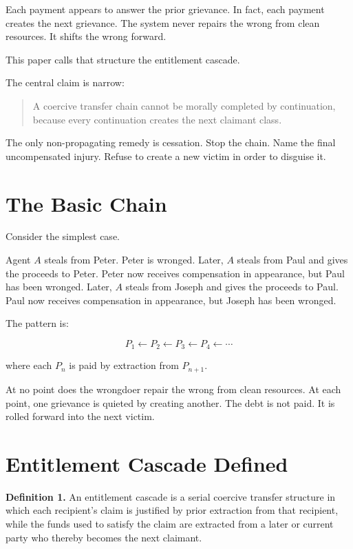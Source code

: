 \documentclass[12pt]{article}
\begin{document}
Each payment appears to answer the prior grievance. In fact, each payment creates the next grievance. The system never repairs the wrong from clean resources. It shifts the wrong forward.

This paper calls that structure the entitlement cascade.

The central claim is narrow:

\begin{quote}
A coercive transfer chain cannot be morally completed by continuation, because every continuation creates the next claimant class.
\end{quote}

The only non-propagating remedy is cessation. Stop the chain. Name the final uncompensated injury. Refuse to create a new victim in order to disguise it.

\section{The Basic Chain}

Consider the simplest case.

Agent \(A\) steals from Peter. Peter is wronged. Later, \(A\) steals from Paul and gives the proceeds to Peter. Peter now receives compensation in appearance, but Paul has been wronged. Later, \(A\) steals from Joseph and gives the proceeds to Paul. Paul now receives compensation in appearance, but Joseph has been wronged.

The pattern is:

\[
P_1 \leftarrow P_2 \leftarrow P_3 \leftarrow P_4 \leftarrow \cdots
\]

where each \(P_n\) is paid by extraction from \(P_{n+1}\).

At no point does the wrongdoer repair the wrong from clean resources. At each point, one grievance is quieted by creating another. The debt is not paid. It is rolled forward into the next victim.

\section{Entitlement Cascade Defined}

\textbf{Definition 1.} An entitlement cascade is a serial coercive transfer structure in which each recipient's claim is justified by prior extraction from that recipient, while the funds used to satisfy the claim are extracted from a later or current party who thereby becomes the next claimant.
\end{document}
